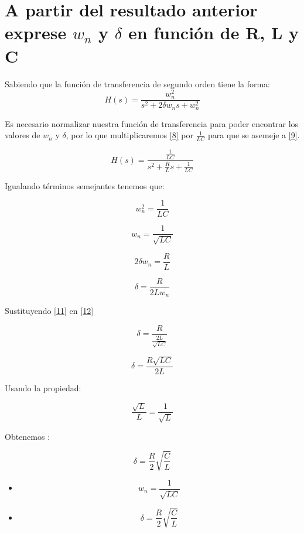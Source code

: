 \documentclass[12pt, letterpaper]{article}
\begin{document}
\section{A partir del resultado anterior exprese \(w_n\) y \(\delta\) en función de R, L y C}

Sabiendo que la función de transferencia de segundo orden tiene la forma:
\begin{equation}
    H(s) = \frac{w_n^2}{s^2 + 2 \delta w_ns + w_n^2}
    \label{9}
\end{equation}

Es necesario normalizar nuestra función de transferencia para poder encontrar los valores de \(w_n\) y \(\delta\), por lo que multiplicaremos \eqref{8} por \(\frac{1}{LC}\) para que se asemeje a \eqref{9}.

\begin{equation}
    H(s) = \frac{\frac{1}{LC}}{s^2 + \frac{R}{L}s + \frac{1}{LC}}
    \label{10}
\end{equation}

Igualando términos semejantes tenemos que:

\[w_n^2 = \frac{1}{LC}\]

\begin{equation}
    w_n = \frac{1}{\sqrt{LC}}
    \label{11}
\end{equation}

\[2 \delta w_n = \frac{R}{L} \]

\begin{equation}
    \delta= \frac{R}{2L w_n} 
    \label{12}
\end{equation}

Sustituyendo \eqref{11} en \eqref{12}

\[ \delta= \frac{R}{\frac{2L}{\sqrt{LC}}} \]

\[ \delta= \frac{R{\sqrt{LC}}}{2L} \]

Usando la propiedad:

\[\frac{\sqrt{L}}{L} = \frac{1}{\sqrt{L}}\]

Obtenemos :

\begin{equation}
    \delta = \frac{R}{2} \sqrt{\frac{C}{L}}
\end{equation}

\begin{itemize}
    \item 
        \begin{center}
            \begin{tcolorbox}[colframe=red!80!black, width=4cm, sharp corners]
                \[w_n = \frac{1}{\sqrt{LC}}\]
            \end{tcolorbox}
        \end{center}
    \item 
        \begin{center}
            \begin{tcolorbox}[colframe=red!80!black, width=4cm, sharp corners]
                \[\delta = \frac{R}{2} \sqrt{\frac{C}{L}}\]
            \end{tcolorbox}
        \end{center}
\end{itemize}
\end{document}
